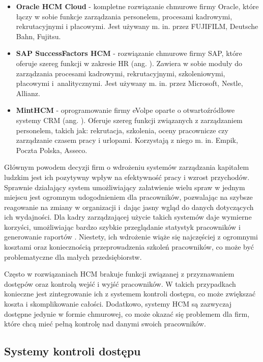 \begin{itemize}
    \item \textbf{Oracle HCM Cloud} \cite{bib:OracleHCM} - kompletne rozwiązanie chmurowe firmy Oracle, które łączy w sobie funkcje zarządzania personelem, procesami kadrowymi, rekrutacyjnymi i płacowymi. Jest używany m. in. przez FUJIFILM, Deutsche Bahn, Fujitsu.
    \item \textbf{SAP SuccessFactors HCM} \cite{bib:SAPHCM} - rozwiązanie chmurowe firmy SAP, które oferuje szereg funkcji w zakresie HR (ang. ). Zawiera w sobie moduły do zarządzania procesami kadrowymi, rekrutacyjnymi, szkoleniowymi, płacowymi i~analitycznymi. Jest używany m. in. przez Microsoft, Nestle, Allianz.
    \item \textbf{MintHCM} \cite{bib:MintHCM} - oprogramowanie firmy eVolpe oparte o otwartoźródłowe systemy CRM (ang. ). Oferuje szereg funkcji związanych z zarządzaniem personelem, takich jak: rekrutacja, szkolenia, oceny pracownicze czy zarządzanie czasem pracy i urlopami.  Korzystają z niego m. in. Empik, Poczta Polska, Asseco.
\end{itemize}

Głównym powodem decyzji firm o wdrożeniu systemów zarządzania kapitałem ludzkim jest ich pozytywny wpływ na efektywność pracy i wzrost przychodów. Sprawnie działający system umożliwiający załatwienie wielu spraw w jednym miejscu jest ogromnym udogodnieniem dla pracowników, pozwalając na szybsze reagowanie na zmiany w organizacji i~dając jasny wgląd do danych dotyczących ich wydajności. Dla kadry zarządzającej użycie takich systemów daje wymierne korzyści, umożliwiając bardzo szybkie przeglądanie statystyk pracowników i generowanie raportów \cite{bib:ZarzadzanieZasobamiLudzkimi}. Niestety, ich wdrożenie wiąże się najczęściej z ogromnymi kosztami oraz koniecznością przeprowadzenia szkoleń pracowników, co może być problematyczne dla małych przedsiębiorstw.

Często w rozwiązaniach HCM brakuje funkcji związanej z przyznawaniem dostępów oraz kontrolą wejść i wyjść pracowników. W takich przypadkach konieczne jest zintegrowanie ich z systemem kontroli dostępu, co może zwiększać koszta i skomplikowanie całości. Dodatkowo, systemy HCM są zazwyczaj dostępne jedynie w formie chmurowej, co może okazać się problemem dla firm, które chcą mieć pełną kontrolę nad danymi swoich pracowników.

\subsection{Systemy kontroli dostępu}

